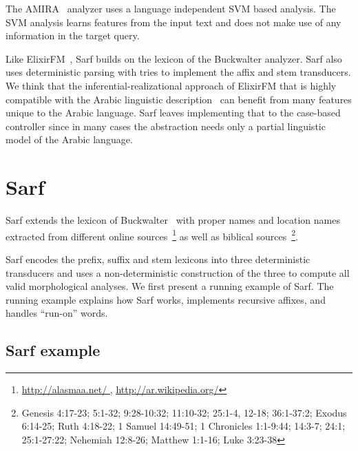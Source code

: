 \documentclass[11pt]{article}
\begin{document}
The AMIRA~\cite{Diab:07} analyzer uses 
a language independent SVM based analysis. 
The SVM analysis learns features from the input text 
and does not make use of any information 
in the target query.

Like ElixirFM~\cite{Otakar:07}, Sarf builds on the lexicon
of the Buckwalter analyzer. 
Sarf also uses deterministic parsing with tries 
to implement the affix and stem transducers. 
We think that the inferential-realizational approach 
of ElixirFM
that is highly compatible with the Arabic linguistic 
description~\cite{Badawi:04}
can benefit from many features unique to the Arabic language.
Sarf leaves implementing that to the case-based controller
since in many cases the abstraction needs only a partial 
linguistic model of the Arabic language. 


\section{Sarf}
\label{sec:sarf}

Sarf extends the lexicon of Buckwalter~ with
proper names and location names extracted from different online 
sources~\footnote{\href{http://alasmaa.net/}{http://alasmaa.net/ }, 
\href{http://ar.wikipedia.org/}{http://ar.wikipedia.org/}}
as well as biblical sources~\footnote{Genesis 4:17-23; 5:1-32; 9:28-10:32; 11:10-32; 25:1-4, 12-18; 36:1-37:2; Exodus 6:14-25; Ruth 4:18-22; 1 Samuel 14:49-51; 1 Chronicles 1:1-9:44; 14:3-7; 24:1; 25:1-27:22; Nehemiah 12:8-26; Matthew 1:1-16; Luke 3:23-38}.

Sarf encodes the prefix, suffix and stem lexicons into
three deterministic transducers and 
uses a non-deterministic construction
of the three to compute all valid morphological analyses.
We first present a running example of Sarf.
The running example explains how Sarf works,
implements recursive affixes, and
handles ``run-on'' words.

\subsection{Sarf example}
\label{sec:example}

\transfalse
\begin{figure}[tb]
\end{figure}
\transtrue
\end{document}
